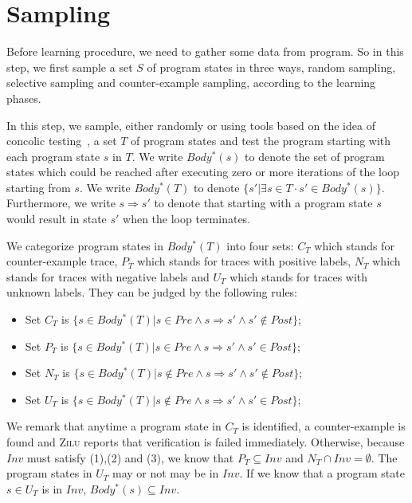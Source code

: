 
\section{Sampling}
Before learning procedure, we need to gather some data from program. 
So in this step, we first sample
a set $S$ of program states in three ways, random sampling, selective sampling and counter-example sampling, 
according to the learning phases.

In this step, we sample, either randomly or using tools based on the idea of concolic testing~\cite{}, 
a set $T$ of program states and test the program starting with each program state $s$ in $T$. 
We write $Body^*(s)$ to denote the set of program states which could be reached after executing zero or more iterations of the loop starting from $s$. 
We write $Body^*(T)$ to denote $\{s' | \exists s \in T \cdot s' \in Body^*(s)\}$. 
Furthermore, we write $s \Rightarrow s'$ to denote that starting with a program state $s$ would result in state $s'$ when the loop terminates. 

We categorize program states in $Body^*(T)$ into four sets:
$C_T$ which stands for counter-example trace, 
$P_T$ which stands for traces with positive labels, 
$N_T$ which stands for traces with negative labels 
and $U_T$ which stands for traces with unknown labels.
They can be judged by the following rules: 
\begin{itemize}
    \item Set $C_T$ is $\{s \in Body^*(T) | s \in Pre \land s \Rightarrow s' \land s' \notin Post\}$;
    \item Set $P_T$ is $\{s \in Body^*(T) | s \in Pre \land s \Rightarrow s' \land s' \in Post\}$;
    \item Set $N_T$ is $\{s \in Body^*(T) | s \notin Pre \land s \Rightarrow s' \land s' \notin Post\}$;
    \item Set $U_T$ is $\{s \in Body^*(T) | s \notin Pre \land s \Rightarrow s' \land s' \in Post\}$;
\end{itemize}
We remark that anytime a program state in $C_T$ is identified, a counter-example is found and \textsc{Zilu} reports that verification is failed immediately. 
Otherwise, because $Inv$ must satisfy (1),(2) and (3), we know that $P_T \subseteq Inv$ and $N_T \cap Inv = \emptyset$. 
The program states in $U_T$ may or not may be in $Inv$. 
If we know that a program state $s \in U_T$ is in $Inv$, $Body^*(s) \subseteq Inv$.

